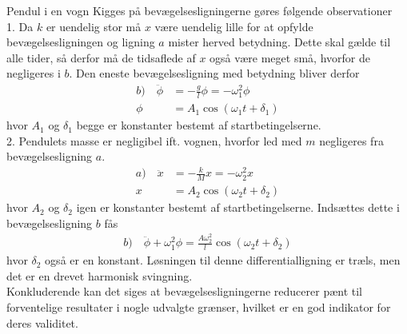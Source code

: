 \documentclass[crop=false, class=memoir]{standalone}
\begin{document}
\begin{opgave}[4]{Pendul i en vogn}
%
\opg Kigges på bevægelsesligningerne gøres følgende observationer \\
%
1. \quad Da $k$ er uendelig stor må $x$ være uendelig lille for at opfylde bevægelsesligningen og ligning $a$ mister herved betydning. Dette skal gælde til alle tider, så derfor må de tidsaflede af $x$ også være meget små, hvorfor de negligeres i $b$. Den eneste bevægelsesligning med betydning bliver derfor
%
\begin{align*}
	b) \quad \ddot{\phi} &= -\frac{g}{l}\phi = -\omega_1^2\phi \\
\phi &= A_1\cos(\omega_1t + \delta_1)
\end{align*}
%
hvor $A_1$ og $\delta_1$ begge er konstanter bestemt af startbetingelserne. \\
%
2. \quad Pendulets masse er negligibel ift. vognen, hvorfor led med $m$ negligeres fra bevægelsesligning $a$.
%
\begin{align*}
	a) \quad \ddot{x} &= -\frac{k}{M}x = -\omega_2^2x \\
	x &= A_2\cos(\omega_2t + \delta_2)
\end{align*}
%
hvor $A_2$ og $\delta_2$ igen er konstanter bestemt af startbetingelserne. Indsættes dette i bevægelsesligning $b$ fås
%
\begin{align*}
b) \quad \ddot{\phi} + \omega_1^2\phi = \frac{A\omega_2^2}{l}\cos(\omega_2t + \delta_2)
\end{align*}
%
hvor $\delta_2$ også er en konstant. Løsningen til denne differentialligning er træls, men det er en drevet harmonisk svingning. \\[2mm]
Konkluderende kan det siges at bevægelsesligningerne reducerer pænt til forventelige resultater i nogle udvalgte grænser, hvilket er en god indikator for deres validitet.
\end{opgave}
\end{document}
